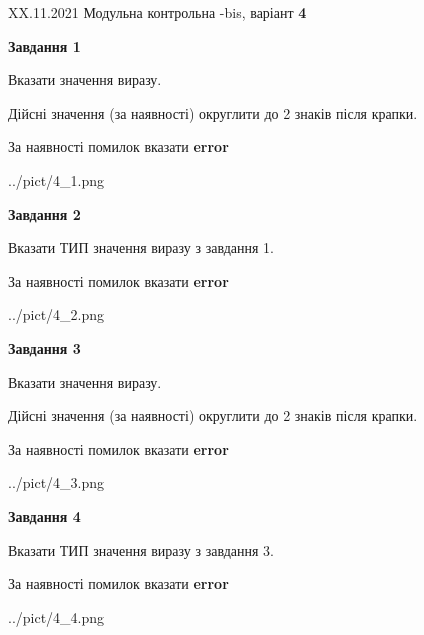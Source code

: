 \documentclass[11pt, ukrainian]{article}
\begin{document}
{XX.11.2021 Модульна контрольна -bis, варіант  \No \textbf { 4 }\par}
{
\begin {large}
{\begin {center}\textbf{Завдання 1}\end {center}}\par
Вказати значення виразу. \par
Дійсні значення (за наявності) округлити до 2 знаків після крапки. \par
За наявності помилок вказати \textbf{error}

\begin{center}
	{../pict/4_1.png}
\end{center}
\newpage

{\begin {center}\textbf{Завдання 2}\end {center}}\par
Вказати ТИП значення виразу з завдання 1. \par
За наявності помилок вказати \textbf{error}

\begin{center}
	{../pict/4_2.png}
\end{center}
\newpage

{\begin {center}\textbf{Завдання 3}\end {center}}\par
Вказати значення виразу. \par
Дійсні значення (за наявності) округлити до 2 знаків після крапки. \par
За наявності помилок вказати \textbf{error}

\begin{center}
	{../pict/4_3.png}
\end{center}
\newpage

{\begin {center}\textbf{Завдання 4}\end {center}}\par
Вказати ТИП значення виразу з завдання 3. \par
За наявності помилок вказати \textbf{error}

\begin{center}
	{../pict/4_4.png}
\end{center}
\newpage


\end{large}}
\end{document}
